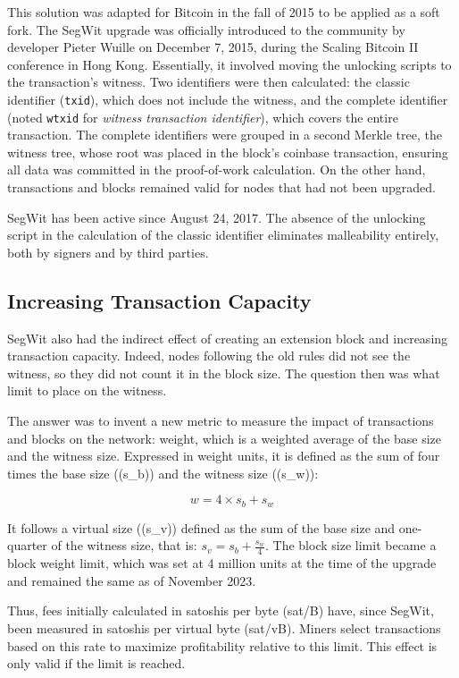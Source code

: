 \documentclass[
  a5paper,
  smalldemyvopaper,10pt,twoside,onecolumn,openright,extrafontsizes,hidelinks]{memoir}
\begin{document}
This solution was adapted for Bitcoin in the fall of 2015 to be applied
as a soft fork. The SegWit upgrade was officially introduced to the
community by developer Pieter Wuille on December 7, 2015, during the
Scaling Bitcoin II conference in Hong Kong. Essentially, it involved
moving the unlocking scripts to the transaction's witness. Two
identifiers were then calculated: the classic identifier
(\texttt{txid}), which does not include the witness, and the complete
identifier (noted \texttt{wtxid} for \emph{witness transaction
identifier}), which covers the entire transaction. The complete
identifiers were grouped in a second Merkle tree, the witness tree,
whose root was placed in the block's coinbase transaction, ensuring all
data was committed in the proof-of-work calculation. On the other hand,
transactions and blocks remained valid for nodes that had not been
upgraded.

SegWit has been active since August 24, 2017. The absence of the
unlocking script in the calculation of the classic identifier eliminates
malleability entirely, both by signers and by third parties.

\subsection{Increasing Transaction
Capacity}\label{increasing-transaction-capacity}

SegWit also had the indirect effect of creating an extension block and
increasing transaction capacity. Indeed, nodes following the old rules
did not see the witness, so they did not count it in the block size. The
question then was what limit to place on the witness.

The answer was to invent a new metric to measure the impact of
transactions and blocks on the network: weight, which is a weighted
average of the base size and the witness size. Expressed in weight
units, it is defined as the sum of four times the base size ((s\_b)) and
the witness size ((s\_w)):

\[
w = 4 \times s_b + s_w
\]

It follows a virtual size ((s\_v)) defined as the sum of the base size
and one-quarter of the witness size, that is:
\(s_v = s_b + \frac{s_w}{4}\). The block size limit became a block
weight limit, which was set at 4 million units at the time of the
upgrade and remained the same as of November 2023.

Thus, fees initially calculated in satoshis per byte (sat/B) have, since
SegWit, been measured in satoshis per virtual byte (sat/vB). Miners
select transactions based on this rate to maximize profitability
relative to this limit. This effect is only valid if the limit is
reached.
\end{document}
